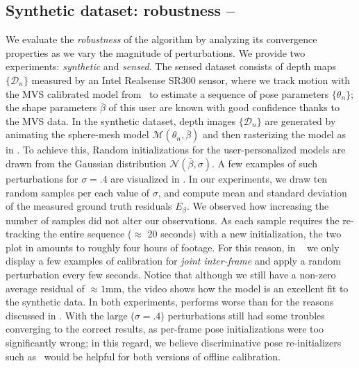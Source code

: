 \subsection{Synthetic dataset: robustness -- }
\label{sec:evalsynth}
We evaluate the \emph{robustness} of the algorithm by analyzing its convergence properties as we vary the magnitude of perturbations.
We provide two experiments: \emph{synthetic} and \emph{sensed}. The sensed dataset consists of depth maps $\{\mathcal{D}_n\}$ measured by an Intel Realsense SR300 sensor, where we track motion with the MVS calibrated model from~\cite{tkach2016sphere} to estimate a sequence of pose parameters $\{ \theta_n \}$; the shape parameters $\bar\beta$ of this user are known with good confidence thanks to the MVS data. In the synthetic dataset, depth images $\{\mathcal{D}_n\}$ are generated by animating the sphere-mesh model $\mathcal{M}(\theta_n, \bar\beta)$ and then rasterizing the model as in .
To achieve this, Random initializations for the user-personalized models are drawn from the Gaussian distribution {\small $\mathcal{N}(\bar\beta, \sigma)$}. A few examples of such perturbations for $\sigma=.4$ are visualized in .
In our experiments, we draw ten random samples per each value of $\sigma$, and compute mean and standard deviation of the measured ground truth residuals $E_\beta$. We observed how increasing the number of samples did not alter our observations. 
As each sample requires the re-tracking the entire sequence ($\approx$ 20 seconds) with a new initialization, the two plot in  amounts to roughly four hours of footage. For this reason, in ~\VideoSynth{} we only display a few examples of calibration for \emph{joint inter-frame} and apply a random perturbation every few seconds.
Notice that although we still have a non-zero average residual of $\approx 1$mm, the video shows how the model is an excellent fit to the synthetic data.  
In both experiments, \OfflineHard{} performs worse than \OfflineSoft{} for the reasons discussed in . With the large ($\sigma=.4$) perturbations \OfflineSoft{} still had some troubles converging to the correct results, as per-frame pose initializations were too significantly wrong; in this regard, we believe discriminative pose re-initializers such as~\cite{oberweger2015hands} would be helpful for both versions of offline calibration.
